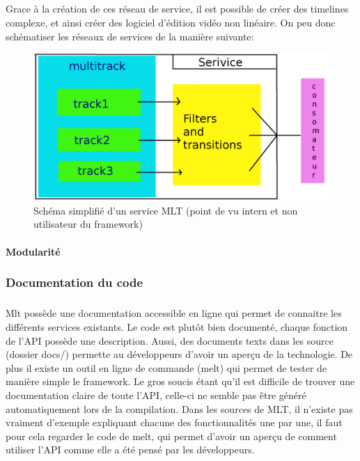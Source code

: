 \subparagraph{}

Grace à la création de ces réseau de service, il est possible de
créer des timelines complexe, et ainsi créer des logiciel d'édition
vidéo non linéaire. On peu donc schématiser les réseaux de services
de la manière suivante:

\begin{figure} [H]

  \begin{center}

    \includegraphics[width=1.0\textwidth]{images/service}

  \end{center}

  \caption{Schéma simplifié d'un service MLT (point de vu intern et
    non utilisateur du framework)}

  \label{Yes}

\end{figure}

\paragraph{Modularité}

\subsubsection{Documentation du code}

\subparagraph{}

Mlt possède une documentation accessible en ligne qui permet de connaitre
les différents services existants. Le code est plutôt bien documenté,
chaque fonction de l'API possède une description. Aussi, des documents
texts dans les source (dossier docs/) permette au développeurs d'avoir un
aperçu de la technologie. De plus il existe un outil en ligne de commande
(melt) qui permet de tester de manière simple le framework. Le gros
soucis étant qu'il est difficile de trouver une documentation claire
de toute l'API, celle-ci ne semble pas être généré automatiquement
lors de la compilation. Dans les sources de MLT, il n'existe pas vraiment
d'exemple expliquant chacune des fonctionnalités une par une, il faut
pour cela regarder le code de melt, qui permet d'avoir un aperçu de
comment utiliser l'API comme elle a été pensé par les développeurs.

